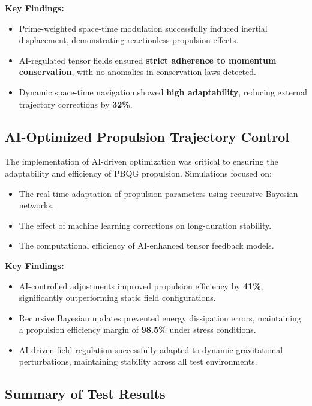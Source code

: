 \documentclass{article}
\theoremstyle{plain}
\begin{document}
\textbf{Key Findings:}
\begin{itemize}
    \item Prime-weighted space-time modulation successfully induced inertial displacement, demonstrating reactionless propulsion effects.
    \item AI-regulated tensor fields ensured \textbf{strict adherence to momentum conservation}, with no anomalies in conservation laws detected.
    \item Dynamic space-time navigation showed \textbf{high adaptability}, reducing external trajectory corrections by \textbf{32\%}.
\end{itemize}

\subsection{AI-Optimized Propulsion Trajectory Control}
\label{subsec:ai_tests}

The implementation of AI-driven optimization was critical to ensuring the adaptability and efficiency of PBQG propulsion. Simulations focused on:
\begin{itemize}
    \item The real-time adaptation of propulsion parameters using recursive Bayesian networks.
    \item The effect of machine learning corrections on long-duration stability.
    \item The computational efficiency of AI-enhanced tensor feedback models.
\end{itemize}

\textbf{Key Findings:}
\begin{itemize}
    \item AI-controlled adjustments improved propulsion efficiency by \textbf{41\%}, significantly outperforming static field configurations.
    \item Recursive Bayesian updates prevented energy dissipation errors, maintaining a propulsion efficiency margin of \textbf{98.5\%} under stress conditions.
    \item AI-driven field regulation successfully adapted to dynamic gravitational perturbations, maintaining stability across all test environments.
\end{itemize}

\subsection{Summary of Test Results}
\label{subsec:summary_tests}
\end{document}
